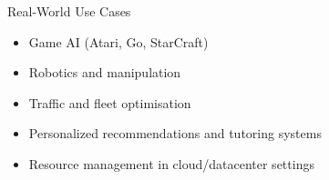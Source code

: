 \documentclass[aspectratio=169]{beamer}
\newcommand{\defaultdeckrefs}{AIMA4e Ch.22 pp.789--822; Poole3e Ch.13 pp.583--608}
\newcommand{\currentsliderefs}{\defaultdeckrefs}
\newcommand{\setslideref}[1]{\gdef\currentsliderefs{#1}}
\begin{document}
\setslideref{AIMA4e Ch.22 pp.789--822; Poole3e Ch.13 pp.583--608}
\begin{frame}{Real-World Use Cases}
\begin{itemize}
  \item Game AI (Atari, Go, StarCraft)
  \item Robotics and manipulation
  \item Traffic and fleet optimisation
  \item Personalized recommendations and tutoring systems
  \item Resource management in cloud/datacenter settings
\end{itemize}
\end{frame}

\setslideref{AIMA4e Ch.22 pp.789--822; Poole3e Ch.13 pp.583--608; doi:10.48550/arXiv.1606.06565}
\end{document}
